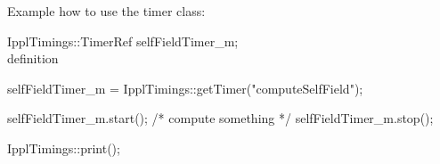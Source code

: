 \clearpage

Example how to use the timer class: \\
\begin{code}

IpplTimings::TimerRef selfFieldTimer_m;    \\ definition

selfFieldTimer_m = IpplTimings::getTimer("computeSelfField");  
 
selfFieldTimer_m.start(); 
    /* compute something */
selfFieldTimer_m.stop();

IpplTimings::print();

\end{code}


